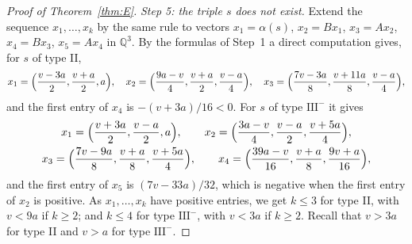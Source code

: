 \documentclass[11pt]{amsart}
\theoremstyle{definition}
\theoremstyle{remark}
\newcommand{\Q}{\mathbb{Q}}
\begin{document}
\begin{proof}[Proof of Theorem~\ref{thm:E}]
\emph{Step 5: the triple $s$ does not exist.} Extend the sequence $x_1,\dots,x_k$ by the same rule to vectors $x_1=\alpha(s)$, $x_2=Bx_1$, $x_3=Ax_2$, $x_4=Bx_3$, $x_5=Ax_4$ in $\Q^3$. By the formulas of Step~1 a direct computation gives, for $s$ of type II,
\[
x_1=\Bigl(\frac{v-3a}{2},\frac{v+a}{2},a\Bigr),\quad
x_2=\Bigl(\frac{9a-v}{4},\frac{v+a}{2},\frac{v-a}{4}\Bigr),\quad
x_3=\Bigl(\frac{7v-3a}{8},\frac{v+11a}{8},\frac{v-a}{4}\Bigr),
\]
and the first entry of $x_4$ is $-(v+3a)/16<0$. For $s$ of type $\mathrm{III}^-$ it gives
\begin{gather*}
x_1=\Bigl(\frac{v+3a}{2},\frac{v-a}{2},a\Bigr),\qquad
x_2=\Bigl(\frac{3a-v}{4},\frac{v-a}{2},\frac{v+5a}{4}\Bigr),\\
x_3=\Bigl(\frac{7v-9a}{8},\frac{v+a}{8},\frac{v+5a}{4}\Bigr),\qquad
x_4=\Bigl(\frac{39a-v}{16},\frac{v+a}{8},\frac{9v+a}{16}\Bigr),
\end{gather*}
and the first entry of $x_5$ is $(7v-33a)/32$, which is negative when the first entry of $x_2$ is positive.
As $x_1,\dots,x_k$ have positive entries, we get $k\le 3$ for type II, with $v<9a$ if $k\ge 2$; and $k\le 4$ for type $\mathrm{III}^-$, with $v<3a$ if $k\ge 2$.
Recall that $v>3a$ for type II and $v>a$ for type $\mathrm{III}^-$.


\end{proof}
\end{document}
